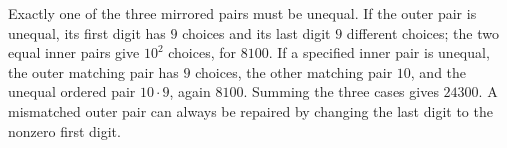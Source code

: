 Exactly one of the three mirrored pairs must be unequal. If the outer pair is unequal, its first digit has $9$ choices and its last digit $9$ different choices; the two equal inner pairs give $10^2$ choices, for $8100$. If a specified inner pair is unequal, the outer matching pair has $9$ choices, the other matching pair $10$, and the unequal ordered pair $10\cdot9$, again $8100$. Summing the three cases gives $\boxed{24300}$. A mismatched outer pair can always be repaired by changing the last digit to the nonzero first digit.
